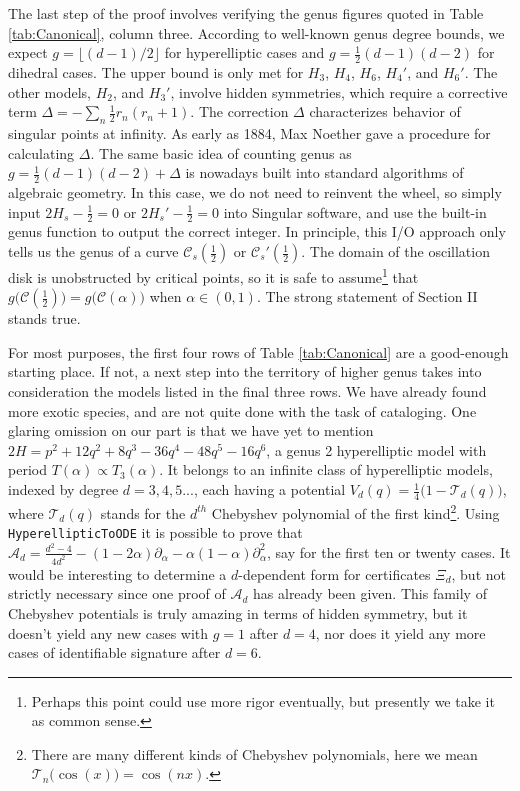 \documentclass[nofootinbib,preprint]{revtex4-1}
\begin{document}
The last step of the proof involves verifying the genus figures quoted in 
Table \ref{tab:Canonical}, column three. According to well-known genus degree 
bounds, we expect $g=\lfloor (d-1)/2 \rfloor$ for hyperelliptic cases and 
$g=\frac{1}{2}(d-1)(d-2)$ for dihedral cases. The upper bound is only 
met for $H_3$, $H_4$, $H_6$, $H_4'$, and $H_6'$. The other models, $H_2$, 
and $H_3'$, involve hidden symmetries, which require a corrective term 
$\Delta = -\sum_{n}\frac{1}{2}r_n(r_n+1)$. The correction $\Delta$ characterizes 
behavior of singular points at infinity. As early as 1884, Max Noether gave a 
procedure for calculating $\Delta$\cite{POPESCU2016}. The same basic idea of 
counting genus as $g=\frac{1}{2}(d-1)(d-2)+\Delta$ is nowadays built into standard algorithms 
of algebraic geometry\cite{GENUS1988}. In this case, we do not need to reinvent the wheel, 
so simply input $2H_s-\frac{1}{2}=0$ or $2H_s'-\frac{1}{2}=0$ into Singular
software, and use the built-in genus function to output the correct integer\cite{SINGULAR2020}. 
In principle, this I/O approach only tells us the genus of a curve 
$\mathcal{C}_s(\frac{1}{2})$ or $\mathcal{C}_s'(\frac{1}{2})$.
The domain of the oscillation disk is unobstructed by critical points, so it 
is safe to assume\footnote{Perhaps this point could use more rigor eventually, 
but presently we take it as common sense.} that 
$g\big(\mathcal{C}(\frac{1}{2})\big)=g\big(\mathcal{C}(\alpha)\big)$ when 
$\alpha \in (0,1)$. The strong statement of Section II stands true.

For most purposes, the first four rows of Table \ref{tab:Canonical} are a 
good-enough starting place. If not, a next step into the territory of higher 
genus takes into consideration the models listed in the final three rows. 
We have already found more exotic species, and are not quite done with the 
task of cataloging. One glaring omission on our part is that we have yet to mention 
${2H=p^2 + 12 q^2 + 8 q^3 -36 q^4 -48 q^5 -16 q^6}$, a genus 2 hyperelliptic model 
with period $T(\alpha) \propto T_3(\alpha)$. It belongs to an infinite class
of hyperelliptic models, indexed by degree $d=3,4,5...$, each having a potential
 ${V_d(q)=\frac{1}{4}\big(1-\mathcal{T}_d(q)\big)}$, where $\mathcal{T}_d(q)$ stands for the 
$d^{th}$ Chebyshev polynomial of the first kind\footnote{There are many different kinds of 
Chebyshev polynomials, here we mean $\mathcal{T}_n\big(\cos(x)\big)=\cos(nx)$.}. 
Using \texttt{HyperellipticToODE} it is possible to prove that 
$\mathcal{A}_d=\frac{d^2-4}{4d^2}-(1-2\alpha)\partial_{\alpha}
-\alpha(1-\alpha)\partial_{\alpha}^2$, say for the first ten or twenty cases. 
It would be interesting to determine a $d$-dependent form for certificates
$\Xi_d$, but not strictly necessary since one proof of $\mathcal{A}_d$ has 
already been given. This family of Chebyshev potentials is truly amazing in 
terms of hidden symmetry, but it doesn't yield any new cases with $g=1$ 
after $d=4$, nor does it yield any more cases of identifiable signature 
after $d=6$.
\end{document}
